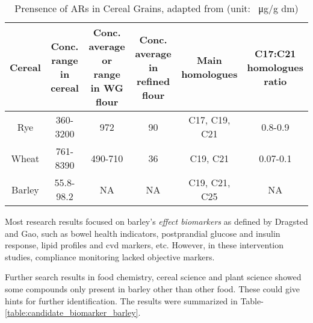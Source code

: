 \begin{table}[h!]
		\footnotesize
\centering
\begin{tabular}{|c|c|c|c|c|c|}
	\hline 
	Cereal & \makecell{Conc. range \\in cereal}& \makecell{Conc. average \\or range \\in WG flour }& \makecell{Conc. average \\in refined \\flour} & \makecell{Main\\homologues} & \makecell{C17:C21\\ homologues\\ratio} \\ 
	\hline 
	Rye&360-3200& 972 &90&C17, C19, C21& 0.8-0.9 \\ 
	\hline 
	Wheat&761-8390& 490-710 & 36& C19, C21& 0.07-0.1 \\ 
	\hline 
	Barley& 55.8-98.2&NA & NA& C19, C21, C25&NA  \\ 
	\hline 
\end{tabular} 
	\caption{Prensence of ARs in Cereal Grains, adapted from \cite{doi:10.1021/jf0340456,ANDERSSON2010794,BORDIGA201638}(unit: \SI{}{\micro\gram}/g dm)}
	\label{table:ars_in_plant}
\end{table}

Most research results focused on barley's \textit{effect biomarkers} as defined by Dragsted\cite{Dragsted2017} and Gao\cite{Gao2017}, such as bowel health indicators\cite{Bird2008}, postprandial glucose and insulin response\cite{Ames2015}, lipid profiles and \acrfull{cvd} markers\cite{Marungruang2018}, etc. However, in these intervention studies, compliance monitoring lacked objective markers.

Further search results in food chemistry, cereal science and plant science showed some compounds only present in barley other than other food. These could give hints for further identification. The results were summarized in Table-\ref{table:candidate_biomarker_barley}.



